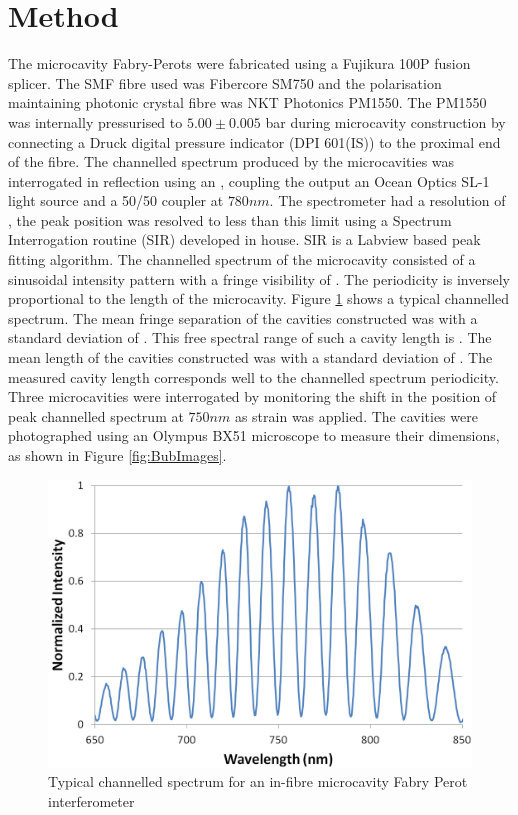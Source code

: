 \documentclass[]{spie}  %
\begin{document}
\section{Method}
The microcavity Fabry-Perots were fabricated using a Fujikura 100P fusion splicer. The SMF fibre used was Fibercore SM750 and the polarisation maintaining photonic crystal fibre was NKT Photonics PM1550. The PM1550 was internally pressurised to $5.00\pm0.005$ bar during microcavity construction by connecting a Druck digital pressure indicator (DPI 601(IS)) to the proximal end of the fibre. The channelled spectrum produced by the microcavities was interrogated in reflection using an , coupling the output an Ocean Optics SL-1 light source and a 50/50 coupler at $780nm$. The spectrometer had a resolution of , the peak position was resolved to less than this limit using a Spectrum Interrogation routine (SIR) developed in house. SIR is a Labview based peak fitting algorithm. The channelled spectrum of the microcavity consisted of a sinusoidal intensity pattern with a fringe visibility of . The periodicity is inversely proportional to the length of the microcavity. Figure \ref{fig:TypSpec} shows a typical channelled spectrum. The mean fringe separation of the cavities constructed was  with a standard deviation of . This free spectral range of such a cavity length is . The mean length of the cavities constructed was  with a standard deviation of . The measured cavity length corresponds well to the channelled spectrum periodicity. Three microcavities were interrogated by monitoring the shift in the position of peak channelled spectrum at $750nm$ as strain was applied. The cavities were photographed using an Olympus BX51 microscope to measure their dimensions, as shown in Figure \ref{fig:BubImages}.

\begin{figure}
\centering
\includegraphics[width=0.51\linewidth]{./Pictures/TypSpec}
\caption{Typical channelled spectrum for an in-fibre microcavity Fabry Perot interferometer}
\label{fig:TypSpec}
\end{figure}
\end{document}
